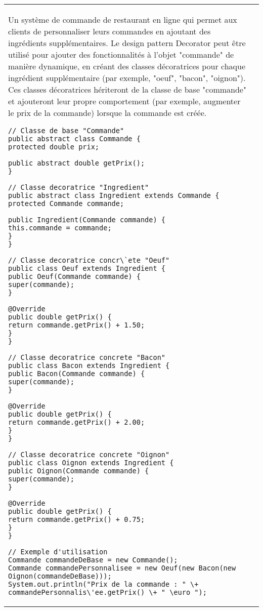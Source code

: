 \begin{table}[H]
\begin{adjustbox}{max width=\textwidth}
\begin{tabular}{l|p{\textwidth}}
\begin{minipage}[tl]{0.5\textwidth}
\begin{minipage}[t]{1\textwidth}
Un système de commande de restaurant en ligne qui permet aux clients de personnaliser leurs commandes en ajoutant des ingrédients supplémentaires. Le design pattern Decorator peut être utilisé pour ajouter des fonctionnalités à l'objet "commande" de manière dynamique, en créant des classes décoratrices pour chaque ingrédient supplémentaire (par exemple, "oeuf", "bacon", "oignon"). Ces classes décoratrices hériteront de la classe de base "commande" et ajouteront leur propre comportement (par exemple, augmenter le prix de la commande) lorsque la commande est créée.
\end{minipage}
\begin{minipage}[b]{1\textwidth}
\begin{lstlisting}[style=monstyle]
// Classe de base "Commande"
public abstract class Commande {
protected double prix;

public abstract double getPrix();
}

// Classe decoratrice "Ingredient"
public abstract class Ingredient extends Commande {
protected Commande commande;

public Ingredient(Commande commande) {
this.commande = commande;
}
}

// Classe decoratrice concr\`ete "Oeuf"
public class Oeuf extends Ingredient {
public Oeuf(Commande commande) {
super(commande);
}

@Override
public double getPrix() {
return commande.getPrix() + 1.50;
}
}

// Classe decoratrice concrete "Bacon"
public class Bacon extends Ingredient {
public Bacon(Commande commande) {
super(commande);
}

@Override
public double getPrix() {
return commande.getPrix() + 2.00;
}
}

// Classe decoratrice concrete "Oignon"
public class Oignon extends Ingredient {
public Oignon(Commande commande) {
super(commande);
}

@Override
public double getPrix() {
return commande.getPrix() + 0.75;
}
}

// Exemple d'utilisation
Commande commandeDeBase = new Commande();
Commande commandePersonnalisee = new Oeuf(new Bacon(new Oignon(commandeDeBase)));
System.out.println("Prix de la commande : " \+ commandePersonnalis\'ee.getPrix() \+ " \euro ");
\end{lstlisting}
\end{minipage}


\end{minipage}
\end{tabular}
\end{adjustbox}
\end{table}
